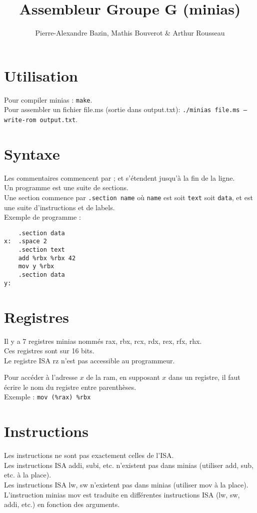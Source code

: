 \documentclass[a4paper]{article}
\title{Assembleur Groupe G (minias)}
\author{Pierre-Alexandre Bazin, Mathis Bouverot \& Arthur Rousseau}
\date{}
\begin{document}
    \maketitle
    \section{Utilisation}
    Pour compiler minias : \texttt{make}.\\
    Pour assembler un fichier file.ms (sortie dans output.txt): \texttt{./minias file.ms --write-rom output.txt}.

    \section{Syntaxe}
    Les commentaires commencent par ; et s'étendent jusqu'à la fin de la ligne.\\
    Un programme est une suite de sections.\\
    Une section commence par \texttt{.section name} où \texttt{name} est soit \texttt{text} soit \texttt{data},
    et est une suite d'instructions et de labels.\\
    Exemple de programme :
\begin{lstlisting}
    .section data
x:  .space 2
    .section text
    add %rbx %rbx 42
    mov y %rbx
    .section data
y:
\end{lstlisting}

    \section{Registres}
    Il y a 7 registres minias nommés rax, rbx, rcx, rdx, rex, rfx, rhx.\\
    Ces registres sont sur 16 bits.\\
    Le registre ISA rz n'est pas accessible au programmeur.

    Pour accéder à l'adresse $x$ de la ram, en supposant $x$ dans un registre, 
    il faut écrire le nom du registre entre parenthèses.\\
    Exemple : \texttt{mov (\%rax) \%rbx}
    
    \section{Instructions}
    Les instructions ne sont pas exactement celles de l'ISA.\\
    Les instructions ISA addi, subi, etc. n'existent pas dans minias (utiliser add, sub, etc. à la place).\\ 
    Les instructions ISA lw, sw n'existent pas dans minias (utiliser mov à la place).\\
    L'instruction minias mov est traduite en différentes instructions ISA (lw, sw, addi, etc.) en fonction des arguments.
\end{document}
